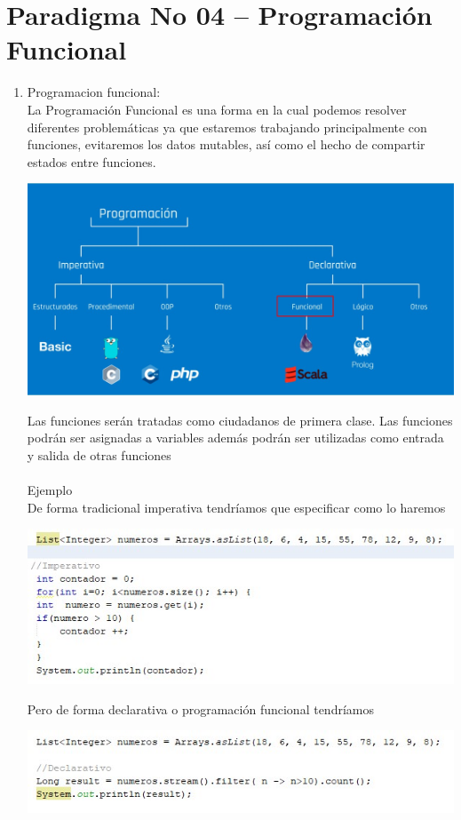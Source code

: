 



\section{Paradigma No 04 – Programación Funcional} 

\begin{enumerate}[1.]
	\item Programacion funcional:
\\
La Programación Funcional  es una forma en la cual podemos resolver diferentes problemáticas ya que estaremos trabajando principalmente con funciones, evitaremos los datos mutables, así como el hecho de compartir estados entre funciones.
\\	
\begin{center}
\includegraphics[scale=0.80]{./Imagenes/img04.jpg} 
\end{center}
Las funciones serán tratadas como ciudadanos de primera clase. Las funciones podrán ser asignadas a variables además podrán ser utilizadas como entrada y salida de otras funciones
\\
\\	
Ejemplo
\\
De forma tradicional imperativa tendríamos que especificar como lo haremos
\begin{center}
\includegraphics[scale=0.55]{./Imagenes/img05.jpg} 
\end{center}


Pero de forma declarativa o programación funcional tendríamos
\begin{center}
\includegraphics[scale=0.55]{./Imagenes/img06.jpg} 
\end{center}




\end{enumerate}






 